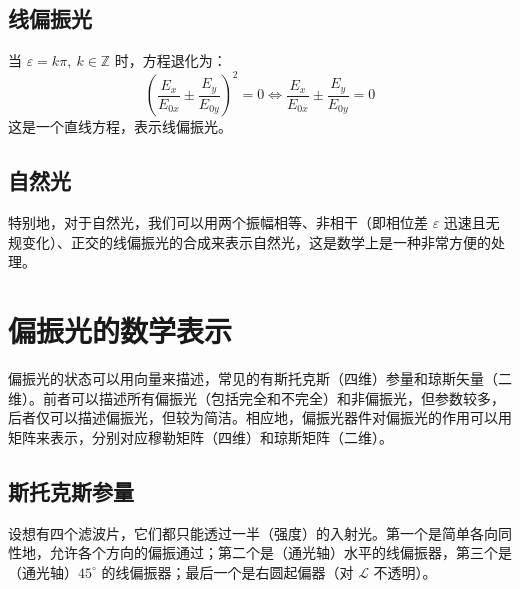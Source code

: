 \documentclass[UTF8]{report}
\def\Z{\mathbb{Z}}
\theoremstyle{MyLineTheoremStyle} %
\theoremstyle{MyBlockTheoremStyle} %
\theoremstyle{MySubsubsectionStyle} %
\begin{document}
\subsection{线偏振光}
当 $\varepsilon = k \pi,\  k \in \Z$ 时，方程退化为：
\begin{equation}
\left( \frac{E_x}{E_{0x}} \pm \frac{E_y}{E_{0y}} \right)^2 = 0 \Longleftrightarrow \frac{E_x}{E_{0x}} \pm \frac{E_y}{E_{0y}} = 0
\end{equation}
这是一个直线方程，表示线偏振光。

\subsection{自然光}
特别地，对于自然光，我们可以用两个振幅相等、非相干（即相位差 $\varepsilon$ 迅速且无规变化）、正交的线偏振光的合成来表示自然光，这是数学上是一种非常方便的处理。

\section{偏振光的数学表示}

偏振光的状态可以用向量来描述，常见的有斯托克斯（四维）参量和琼斯矢量（二维）。前者可以描述所有偏振光（包括完全和不完全）和非偏振光，但参数较多，后者仅可以描述偏振光，但较为简洁。相应地，偏振光器件对偏振光的作用可以用矩阵来表示，分别对应穆勒矩阵（四维）和琼斯矩阵（二维）。

\subsection{斯托克斯参量}
设想有四个滤波片，它们都只能透过一半（强度）的入射光。第一个是简单各向同性地，允许各个方向的偏振通过；第二个是（通光轴）水平的线偏振器，第三个是（通光轴）$45^\circ$ 的线偏振器；最后一个是右圆起偏器（对 $\mathscr{L}$ 不透明）。
\end{document}

